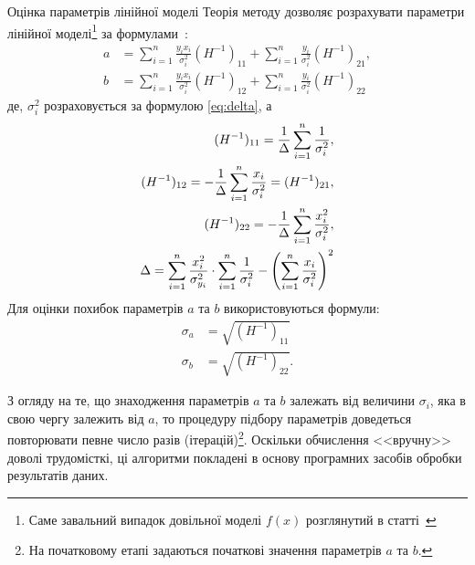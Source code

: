 \documentclass{LabBook}
\begin{document}
\begin{More}{Оцінка параметрів лінійної моделі}
	Теорія методу дозволяє розрахувати параметри лінійної моделі\footnote{Саме завальний випадок довільної моделі $f(x)$ розглянутий в статті~\cite{OREAR_LS}} за формулами~\cite{OREAR_LS}:
	\begin{align*}\label{}
		a & =\sum\limits_{i = 1}^n \frac{y_i x_i}{\sigma_{i}^2} (H^{-1})_{11} + \sum\limits_{i = 1}^n \frac{y_i}{\sigma_{i}^2} (H^{-1})_{21}, \\
		b & =\sum\limits_{i = 1}^n \frac{y_i x_i}{\sigma_{i}^2} (H^{-1})_{12} + \sum\limits_{i = 1}^n \frac{y_i}{\sigma_{i}^2} (H^{-1})_{22}
	\end{align*}
	де, $\sigma_i^2$ розраховується за формулою \eqref{eq:delta}, а
	\begin{align*}\label{}
		(H^{-1})_{11} = \frac1\Delta \sum\limits_{i = 1}^n \frac{1}{\sigma_{i}^2},                       \\
		(H^{-1})_{12} =-  \frac1\Delta \sum\limits_{i = 1}^n  \frac{x_i}{\sigma_{i}^2} = (H^{-1})_{21} , \\
		(H^{-1})_{22} =-  \frac1\Delta \sum\limits_{i = 1}^n \frac{x_i^2}{\sigma_{i}^2},                 \\
		\Delta =   \sum\limits_{i = 1}^n \frac{x_i^2}{\sigma_{y_i}^2} \cdot \sum\limits_{i = 1}^n \frac{1}{\sigma_{i}^2} - \left(\sum\limits_{i = 1}^n \frac{x_i}{\sigma_{i}^2} \right)^2
	\end{align*}
	Для оцінки похибок параметрів $a$ та $b$ використовуються формули:
	\begin{align*}
		\sigma_a & = \sqrt{(H^{-1})_{11} } \\
		\sigma_b & = \sqrt{(H^{-1})_{22}}.
	\end{align*}

	З огляду на те, що знаходження параметрів $a$ та $b$ залежать від величини $\sigma_i$, яка в свою чергу залежить від $a$, то процедуру підбору параметрів доведеться повторювати певне число разів (ітерацій)\footnote{На початковому етапі задаються початкові значення параметрів $a$  та $b$.}. Оскільки обчислення <<вручну>> доволі трудомісткі, ці алгоритми покладені в основу програмних засобів обробки результатів даних.
\end{More}

\end{document}
